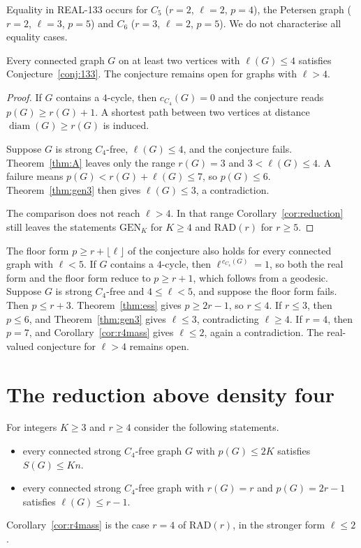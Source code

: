 \documentclass[ASNA]{USG}
\theoremstyle{WBstyletwo}
\numberwithin{equation}{section}
\newcommand{\lr}{\ell}
\newcommand{\pp}{p}
\newcommand{\GEN}{\mathrm{GEN}}
\newcommand{\RAD}{\mathrm{RAD}}
\begin{document}
Equality in REAL-133 occurs for $C_5$ ($r=2$, $\lr=2$, $\pp=4$), the Petersen graph ($r=2$, $\lr=3$, $\pp=5$) and $C_6$ ($r=3$, $\lr=2$, $\pp=5$). We do not characterise all equality cases.

\begin{corollary}\label{cor:real133}
Every connected graph $G$ on at least two vertices with $\lr(G)\le 4$ satisfies Conjecture~\ref{conj:133}. The conjecture remains open for graphs with $\lr>4$.
\end{corollary}

\begin{proof}
If $G$ contains a $4$-cycle, then $c_{C_4}(G)=0$ and the conjecture reads $\pp(G)\ge r(G)+1$. A shortest path between two vertices at distance $\operatorname{diam}(G)\ge r(G)$ is induced.

Suppose $G$ is strong $C_4$-free, $\lr(G)\le 4$, and the conjecture fails. Theorem~\ref{thm:A} leaves only the range $r(G)=3$ and $3<\lr(G)\le 4$. A failure means $\pp(G)<r(G)+\lr(G)\le 7$, so $\pp(G)\le 6$. Theorem~\ref{thm:gen3} then gives $\lr(G)\le 3$, a contradiction.

The comparison does not reach $\lr>4$. In that range Corollary~\ref{cor:reduction} still leaves the statements $\GEN_K$ for $K\ge 4$ and $\RAD(r)$ for $r\ge 5$.
\end{proof}

\begin{remark}\label{rem:floor}
The floor form $\pp\ge r+\lfloor\lr\rfloor$ of the conjecture also holds for every connected graph with $\lr<5$. If $G$ contains a $4$-cycle, then $\lr^{\,c_{C_4}(G)}=1$, so both the real form and the floor form reduce to $\pp\ge r+1$, which follows from a geodesic. Suppose $G$ is strong $C_4$-free and $4\le\lr<5$, and suppose the floor form fails. Then $\pp\le r+3$. Theorem~\ref{thm:ess} gives $\pp\ge 2r-1$, so $r\le 4$. If $r\le 3$, then $\pp\le 6$, and Theorem~\ref{thm:gen3} gives $\lr\le 3$, contradicting $\lr\ge 4$. If $r=4$, then $\pp=7$, and Corollary~\ref{cor:r4mass} gives $\lr\le 2$, again a contradiction. The real-valued conjecture for $\lr>4$ remains open.
\end{remark}

\section{The reduction above density four}\label{sec:band}

For integers $K\ge 3$ and $r\ge 4$ consider the following statements.
\begin{itemize}
\item[$\GEN_K$:] every connected strong $C_4$-free graph $G$ with $\pp(G)\le 2K$ satisfies $S(G)\le Kn$.
\item[$\RAD(r)$:] every connected strong $C_4$-free graph with $r(G)=r$ and $\pp(G)=2r-1$ satisfies $\lr(G)\le r-1$.
\end{itemize}
Corollary~\ref{cor:r4mass} is the case $r=4$ of $\RAD(r)$, in the stronger form $\lr\le 2$.
\end{document}
